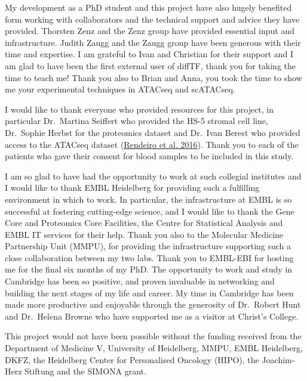 \documentclass[11pt, a4paper, twosided]{book}
\begin{document}
My development as a PhD student and this project have also hugely benefited form working with collaborators and the technical support and advice they have provided. Thorsten Zenz and the Zenz group have provided essential input and infrastructure. Judith Zaugg and the Zaugg group have been generous with their time and expertise. I am grateful to Ivan and Christian for their support and I am glad to have been the first external user of diffTF, thank you for taking the time to teach me! Thank you also to Brian and Anna, you took the time to show me your experimental techniques in ATACseq and scATACseq.

I would like to thank everyone who provided resources for this project, in particular Dr.~Martina Seiffert who provided the HS-5 stromal cell line, Dr.~Sophie Herbst for the proteomics dataset and Dr.~Ivan Berest who provided access to the ATACseq dataset (\protect\hyperlink{ref-Rendeiro2016}{Rendeiro et al. 2016}). Thank you to each of the patients who gave their consent for blood samples to be included in this study.

I am so glad to have had the opportunity to work at such collegial institutes and I would like to thank EMBL Heidelberg for providing such a fulfilling environment in which to work. In particular, the infrastructure at EMBL is so successful at fostering cutting-edge science, and I would like to thank the Gene Core and Proteomics Core Facilities, the Centre for Statistical Analysis and EMBL IT services for their help. Thank you also to the Molecular Medicine Partnership Unit (MMPU), for providing the infrastructure supporting such a close collaboration between my two labs. Thank you to EMBL-EBI for hosting me for the final six months of my PhD. The opportunity to work and study in Cambridge has been so positive, and proven invaluable in networking and building the next stages of my life and career. My time in Cambridge has been made more productive and enjoyable through the generosity of Dr.~Robert Hunt and Dr.~Helena Browne who have supported me as a visitor at Christ's College.

This project would not have been possible without the funding received from the Department of Medicine V, University of Heidelberg, MMPU, EMBL Heidelberg, DKFZ, the Heidelberg Center for Personalised Oncology (HIPO), the Joachim-Herz Stiftung and the SIMONA grant.
\end{document}
